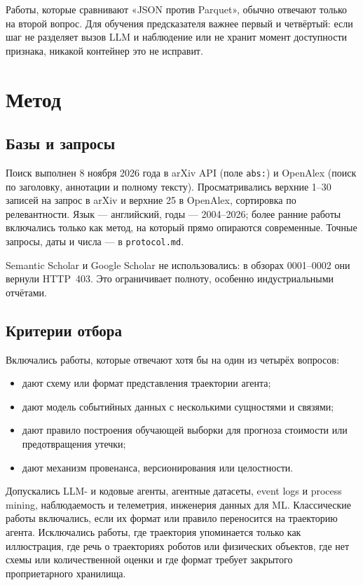 \documentclass[11pt,a4paper]{article}
\begin{document}
Работы, которые сравнивают «JSON против Parquet», обычно отвечают только на
второй вопрос. Для обучения предсказателя важнее первый и четвёртый: если
шаг не разделяет вызов LLM и наблюдение или не хранит момент доступности
признака, никакой контейнер это не исправит.

\section{Метод}

\subsection{Базы и запросы}

Поиск выполнен 8 ноября 2026 года в arXiv API (поле \texttt{abs:}) и
OpenAlex (поиск по заголовку, аннотации и полному тексту). Просматривались
верхние 1--30 записей на запрос в arXiv и верхние 25 в OpenAlex, сортировка
по релевантности. Язык — английский, годы — 2004--2026; более ранние работы
включались только как метод, на который прямо опираются современные. Точные
запросы, даты и числа — в \texttt{protocol.md}.

Semantic Scholar и Google Scholar не использовались: в обзорах 0001--0002
они вернули HTTP~403. Это ограничивает полноту, особенно индустриальными
отчётами.

\subsection{Критерии отбора}

Включались работы, которые отвечают хотя бы на один из четырёх вопросов:

\begin{itemize}
  \item дают схему или формат представления траектории агента;
  \item дают модель событийных данных с несколькими сущностями и связями;
  \item дают правило построения обучающей выборки для прогноза стоимости
        или предотвращения утечки;
  \item дают механизм провенанса, версионирования или целостности.
\end{itemize}

Допускались LLM- и кодовые агенты, агентные датасеты, event logs и process
mining, наблюдаемость и телеметрия, инженерия данных для ML. Классические
работы включались, если их формат или правило переносится на траекторию
агента. Исключались работы, где траектория упоминается только как
иллюстрация, где речь о траекториях роботов или физических объектов, где
нет схемы или количественной оценки и где формат требует закрытого
проприетарного хранилища.
\end{document}
